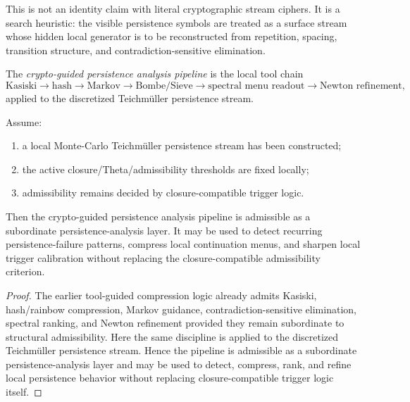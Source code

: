 \begin{remark}
\label{rem:how-to-read-the-vernam-like-heuristic}
This is not an identity claim with literal cryptographic stream ciphers.
It is a search heuristic: the visible persistence symbols are treated as a surface stream whose hidden local generator is to be reconstructed from repetition, spacing, transition structure, and contradiction-sensitive elimination.
\end{remark}

\begin{definition}
\label{def:crypto-guided-persistence-analysis-pipeline}
The \emph{crypto-guided persistence analysis pipeline} is the local tool chain
\[
\text{Kasiski}
\to
\text{hash}
\to
\text{Markov}
\to
\text{Bombe/Sieve}
\to
\text{spectral menu readout}
\to
\text{Newton refinement},
\]
applied to the discretized Teichm\"uller persistence stream.
\end{definition}

\begin{theorem}
\label{thm:first-crypto-guided-persistence-scan-theorem}
Assume:
\begin{enumerate}
    \item a local Monte-Carlo Teichm\"uller persistence stream has been constructed;
    \item the active closure/Theta/admissibility thresholds are fixed locally;
    \item admissibility remains decided by closure-compatible trigger logic.
\end{enumerate}
Then the crypto-guided persistence analysis pipeline is admissible as a subordinate persistence-analysis layer.
It may be used to detect recurring persistence-failure patterns, compress local continuation menus, and sharpen local trigger calibration without replacing the closure-compatible admissibility criterion.
\end{theorem}

\begin{proof}
The earlier tool-guided compression logic already admits Kasiski, hash/rainbow compression, Markov guidance, contradiction-sensitive elimination, spectral ranking, and Newton refinement provided they remain subordinate to structural admissibility.
Here the same discipline is applied to the discretized Teichm\"uller persistence stream.
Hence the pipeline is admissible as a subordinate persistence-analysis layer and may be used to detect, compress, rank, and refine local persistence behavior without replacing closure-compatible trigger logic itself.
\end{proof}

